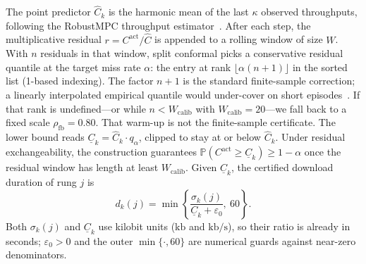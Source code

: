 The point predictor \(\hat{C}_k\) is the harmonic mean of the last \(\kappa\) observed throughputs, following the RobustMPC throughput estimator~\cite{yin2015control}.
After each step, the multiplicative residual \(r=C^{\mathrm{act}}/\hat{C}\) is appended to a rolling window of size \(W\).
With \(n\) residuals in that window, split conformal picks a conservative residual quantile at the target miss rate \(\alpha\): the entry at rank \(\lfloor\alpha(n{+}1)\rfloor\) in the sorted list (1-based indexing).
The factor \(n{+}1\) is the standard finite-sample correction; a linearly interpolated empirical quantile would under-cover on short episodes~\cite{vovk2005algorithmic,angelopoulos2023gentle}.
If that rank is undefined---or while \(n<W_{\mathrm{calib}}\) with \(W_{\mathrm{calib}}{=}20\)---we fall back to a fixed scale \(\rho_{\mathrm{fb}}{=}0.80\). That warm-up is not the finite-sample certificate.
The lower bound reads \(\underline{C}_k=\hat{C}_k\cdot q_{\alpha}\), clipped to stay at or below \(\hat{C}_k\).
Under residual exchangeability, the construction guarantees \(\mathbb{P}(C^{\mathrm{act}}\ge\underline{C}_k)\ge 1-\alpha\) once the residual window has length at least \(W_{\mathrm{calib}}\).
Given \(\underline{C}_k\), the certified download duration of rung \(j\) is
\begin{equation}
\label{eq:dl}
    d_k(j)=\min\!\left\{\frac{\sigma_k(j)}{\underline{C}_k+\varepsilon_0},\ 60\right\}.
\end{equation}
Both \(\sigma_k(j)\) and \(\underline{C}_k\) use kilobit units (\(\mathrm{kb}\) and \(\mathrm{kb/s}\)), so their ratio is already in seconds; \(\varepsilon_0{>}0\) and the outer \(\min\{\cdot,60\}\) are numerical guards against near-zero denominators.

